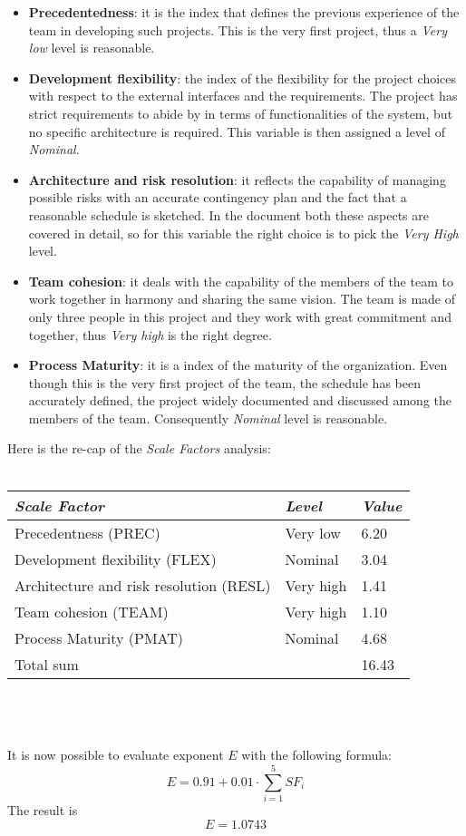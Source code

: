 \documentclass[11pt,a4paper]{report}
\begin{document}
\begin{itemize}
	\item \textbf{Precedentedness}: it is the index that defines the previous experience of the team in developing such projects. This is the very first project, thus a \textit{Very low} level is reasonable.
	\item \textbf{Development flexibility}: the index of the flexibility for the project choices with respect to the external interfaces and the requirements. The project has strict requirements to abide by in terms of functionalities of the system, but no specific architecture is required. This variable is then assigned a level of \textit{Nominal}.
	\item \textbf{Architecture and risk resolution}: it reflects the capability of managing possible risks with an accurate contingency plan and the fact that a reasonable schedule is sketched. In the document both these aspects are covered in detail, so for this variable the right choice is to pick the \textit{Very High} level.
	\item \textbf{Team cohesion}: it deals with the capability of the members of the team to work together in harmony and sharing the same vision. The team is made of only three people in this project and they work with great commitment and together, thus \textit{Very high} is the right degree.
	\item \textbf{Process Maturity}: it is a index of the maturity of the organization. Even though this is the very first project of the team, the schedule has been accurately defined, the project widely documented and discussed among the members of the team. Consequently \textit{Nominal} level is reasonable.
\end{itemize}
Here is the re-cap of the \textit{Scale Factors} analysis:
\\\\
\begin{tabularx}{\textwidth}{|p{8cm}|X|X|}
	\hline
	\textit{Scale Factor} & \textit{Level} & \textit{Value}\\
	\hline
	Precedentness (PREC) & Very low & 6.20\\
	Development flexibility (FLEX) & Nominal & 3.04\\
	Architecture and risk resolution (RESL) & Very high & 1.41\\
	Team cohesion (TEAM) & Very high & 1.10\\
	Process Maturity (PMAT) & Nominal & 4.68\\
	\hline
	Total sum &  & 16.43\\
	\hline
\end{tabularx}\\\\\\
It is now possible to evaluate exponent $E$ with the following formula:
$$E = 0.91+0.01 \cdot \sum_{i=1}^5 SF_i$$
The result is 
$$E = 1.0743$$
\end{document}
